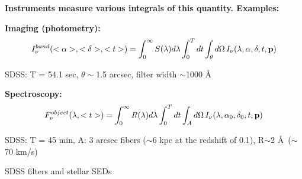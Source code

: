 \documentclass[letterpaper,landscape]{slides}
\begin{document}
\begin{slide}
	\begin{center}
		\bfseries
		{\large {\color{red} Instruments measure various integrals of this quantity. Examples:}}
	\end{center}
	
	\vskip 0.6in
	
	{\bf Imaging (photometry):}
	\begin{equation}
	I_\nu^{band}(<\alpha>, <\delta>, <t>) = \int_{0}^{\infty} S(\lambda)d\lambda 
	\int_{0}^T dt \int_{\theta}d\Omega  \, I_\nu (\lambda, \alpha, \delta, t, {\bf p}) 
	\end{equation}
	
	{\color{red} SDSS: \color{blue} T = 54.1 sec, $\theta \sim$1.5 arcsec, filter width $\sim$1000 \AA}
	
	{\bf Spectroscopy:}
	\begin{equation}
	F_{\nu}^{object}(\lambda, <t>) = \int_{0}^{\infty} R(\lambda)d\lambda 
	\int_{0}^T dt \int_{A}d\Omega  \, I_\nu (\lambda, \alpha_0, \delta_0, t, {\bf p}) 
	\end{equation}
	
	{\color{red} SDSS: \color{blue} T = 45 min, A: 3 arcsec fibers ($\sim$6 kpc at the redshift of 0.1),
		R$\sim$2 \AA \, ($\sim$70 km/s)}
	
\end{slide}



\begin{slide}
	\begin{center}
		\begin{minipage}{6in}
			\vskip 1.5in
			\hskip -1.8in
			{}
			\vskip 0.5in
			{\large \color{blue} SDSS filters and stellar SEDs}
		\end{minipage}
	\end{center}
	\vfill
\end{slide}
\end{document}
